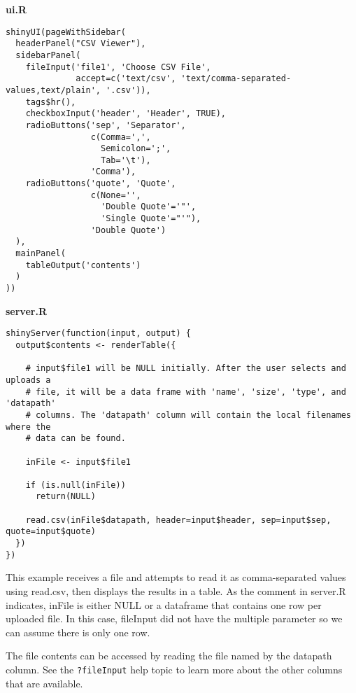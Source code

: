 \begin{framed}
\textbf{ui.R}

\begin{verbatim}
shinyUI(pageWithSidebar(
  headerPanel("CSV Viewer"),
  sidebarPanel(
    fileInput('file1', 'Choose CSV File',
              accept=c('text/csv', 'text/comma-separated-values,text/plain', '.csv')),
    tags$hr(),
    checkboxInput('header', 'Header', TRUE),
    radioButtons('sep', 'Separator',
                 c(Comma=',',
                   Semicolon=';',
                   Tab='\t'),
                 'Comma'),
    radioButtons('quote', 'Quote',
                 c(None='',
                   'Double Quote'='"',
                   'Single Quote'="'"),
                 'Double Quote')
  ),
  mainPanel(
    tableOutput('contents')
  )
))
\end{verbatim}
\end{framed}
\newpage
\begin{framed}
\textbf{server.R}

\begin{verbatim}
shinyServer(function(input, output) {
  output$contents <- renderTable({
    
    # input$file1 will be NULL initially. After the user selects and uploads a 
    # file, it will be a data frame with 'name', 'size', 'type', and 'datapath' 
    # columns. The 'datapath' column will contain the local filenames where the 
    # data can be found.

    inFile <- input$file1

    if (is.null(inFile))
      return(NULL)
    
    read.csv(inFile$datapath, header=input$header, sep=input$sep, quote=input$quote)
  })
})
\end{verbatim}
\end{framed}
This example receives a file and attempts to read it as comma-separated values using read.csv, then displays the results in a table. As the comment in server.R indicates, inFile is either NULL or a dataframe that contains one row per uploaded file. In this case, fileInput did not have the multiple parameter so we can assume there is only one row.

The file contents can be accessed by reading the file named by the datapath column. See the \texttt{?fileInput} help topic to learn more about the other columns that are available.

